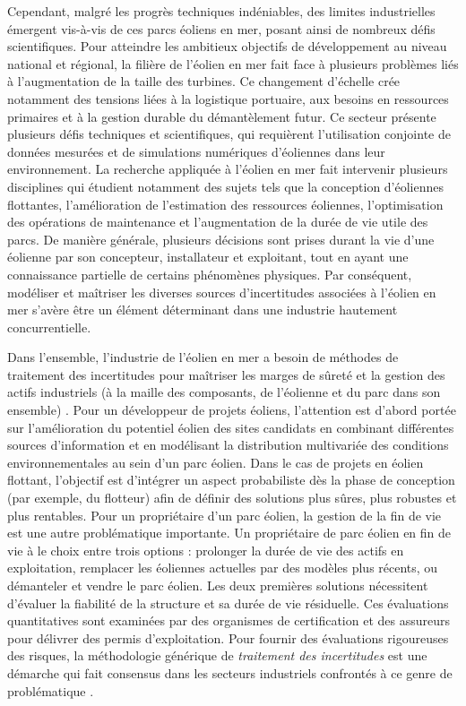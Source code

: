 Cependant, malgré les progrès techniques indéniables, des limites industrielles émergent vis-à-vis de ces parcs éoliens en mer, posant ainsi de nombreux défis scientifiques. 
Pour atteindre les ambitieux objectifs de développement au niveau national et régional, la filière de l'éolien en mer fait face à plusieurs problèmes liés à l'augmentation de la taille des turbines.
Ce changement d'échelle crée notamment des tensions liées à la logistique portuaire, aux besoins en ressources primaires et à la gestion durable du démantèlement futur. 
Ce secteur présente plusieurs défis techniques et scientifiques, qui requièrent l'utilisation conjointe de données mesurées et de simulations numériques d'éoliennes dans leur environnement. 
La recherche appliquée à l'éolien en mer fait intervenir plusieurs disciplines qui étudient notamment des sujets tels que la conception d'éoliennes flottantes, l'amélioration de l'estimation des ressources éoliennes, l'optimisation des opérations de maintenance et l'augmentation de la durée de vie utile des parcs. 
De manière générale, plusieurs décisions sont prises durant la vie d'une éolienne par son concepteur, installateur et exploitant, tout en ayant une connaissance partielle de certains phénomènes physiques. 
Par conséquent, modéliser et maîtriser les diverses sources d'incertitudes associées à l'éolien en mer s'avère être un élément déterminant dans une industrie hautement concurrentielle.

Dans l'ensemble, l'industrie de l'éolien en mer a besoin de méthodes de traitement des incertitudes pour maîtriser les marges de sûreté et la gestion des actifs industriels (à la maille des composants, de l'éolienne et du parc dans son ensemble) \cite{OWT_review_2016}. 
Pour un développeur de projets éoliens, l'attention est d'abord portée sur l'amélioration du potentiel éolien des sites candidats en combinant différentes sources d'information et en modélisant la distribution multivariée des conditions environnementales au sein d'un parc éolien. 
Dans le cas de projets en éolien flottant, l'objectif est d'intégrer un aspect probabiliste dès la phase de conception (par exemple, du flotteur) afin de définir des solutions plus sûres, plus robustes et plus rentables. 
Pour un propriétaire d'un parc éolien, la gestion de la fin de vie est une autre problématique importante. 
Un propriétaire de parc éolien en fin de vie à le choix entre trois options : prolonger la durée de vie des actifs en exploitation, remplacer les éoliennes actuelles par des modèles plus récents, ou démanteler et vendre le parc éolien. 
Les deux premières solutions nécessitent d'évaluer la fiabilité de la structure et sa durée de vie résiduelle. Ces évaluations quantitatives sont examinées par des organismes de certification et des assureurs pour délivrer des permis d'exploitation. 
Pour fournir des évaluations rigoureuses des risques, la méthodologie générique de \textit{traitement des incertitudes} est une démarche qui fait consensus dans les secteurs industriels confrontés à ce genre de problématique \cite{rocquigny_2008}.


